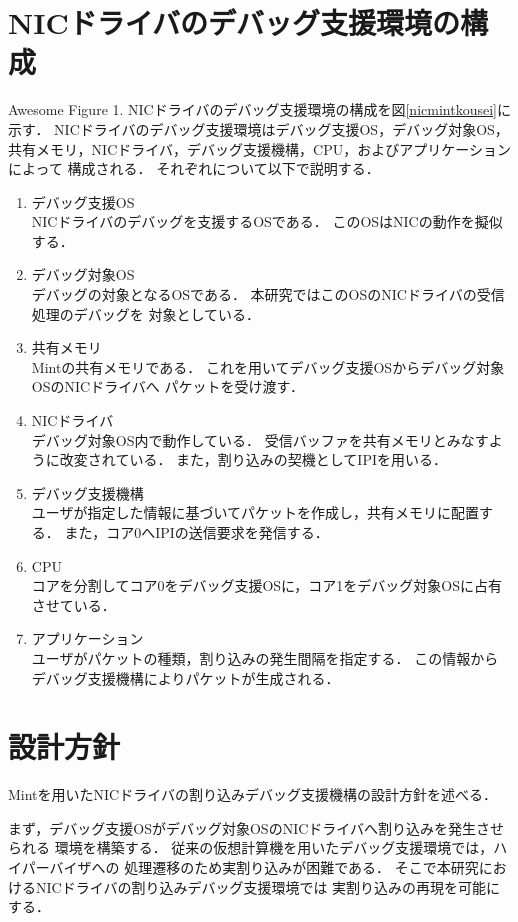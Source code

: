 \documentclass[tanilab-enum]{graduate}
\begin{document}
\section{NICドライバのデバッグ支援環境の構成}
{Awesome Figure 1.}
NICドライバのデバッグ支援環境の構成を図\ref{nicmintkousei}に示す．
NICドライバのデバッグ支援環境はデバッグ支援OS，デバッグ対象OS，
共有メモリ，NICドライバ，デバッグ支援機構，CPU，およびアプリケーションによって
構成される．
それぞれについて以下で説明する．
\begin{enumerate}
    \item デバッグ支援OS\\
        NICドライバのデバッグを支援するOSである．
        このOSはNICの動作を擬似する．
    \item デバッグ対象OS\\
        デバッグの対象となるOSである．
        本研究ではこのOSのNICドライバの受信処理のデバッグを
        対象としている．
    \item 共有メモリ\\
        Mintの共有メモリである．
        これを用いてデバッグ支援OSからデバッグ対象OSのNICドライバへ
        パケットを受け渡す．
    \item NICドライバ\\
        デバッグ対象OS内で動作している．
        受信バッファを共有メモリとみなすように改変されている．
        また，割り込みの契機としてIPIを用いる．
    \item デバッグ支援機構\\
        ユーザが指定した情報に基づいてパケットを作成し，共有メモリに配置する．
        また，コア0へIPIの送信要求を発信する．
    \item CPU\\
        コアを分割してコア0をデバッグ支援OSに，コア1をデバッグ対象OSに占有させている．
    \item アプリケーション\\
        ユーザがパケットの種類，割り込みの発生間隔を指定する．
        この情報からデバッグ支援機構によりパケットが生成される．
\end{enumerate}

\section{設計方針}
Mintを用いたNICドライバの割り込みデバッグ支援機構の設計方針を述べる．

まず，デバッグ支援OSがデバッグ対象OSのNICドライバへ割り込みを発生させられる
環境を構築する．
従来の仮想計算機を用いたデバッグ支援環境では，ハイパーバイザへの
処理遷移のため実割り込みが困難である．
そこで本研究におけるNICドライバの割り込みデバッグ支援環境では
実割り込みの再現を可能にする．
\end{document}
